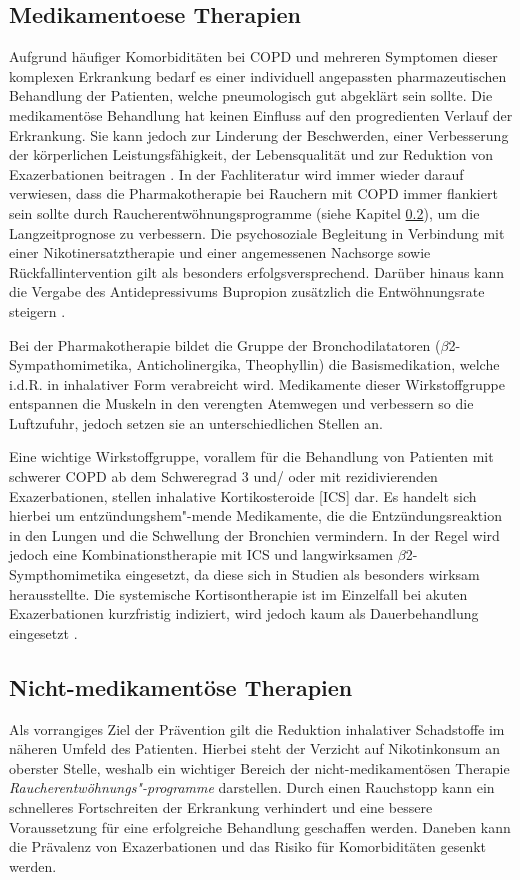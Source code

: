 \subsection{Medikamentoese Therapien}
\label{medikamentoese_therapien}
Aufgrund häufiger Komorbiditäten bei COPD und mehreren Symptomen dieser komplexen Erkrankung bedarf es einer individuell angepassten pharmazeutischen Behandlung der Patienten, welche pneumologisch gut abgeklärt sein sollte. Die medikamentöse Behandlung hat keinen Einfluss auf den progredienten Verlauf der Erkrankung. Sie kann jedoch zur Linderung der Beschwerden, einer Verbesserung der körperlichen Leistungsfähigkeit, der Lebensqualität und zur Reduktion von Exazerbationen beitragen \autocite[vgl.][249]{gillissen2007}. In der Fachliteratur wird immer wieder darauf verwiesen, dass die Pharmakotherapie bei Rauchern mit COPD immer flankiert sein sollte durch Raucherentwöhnungsprogramme (siehe Kapitel \ref{nicht-medikamentoese_therapien}), um die Langzeitprognose zu verbessern. Die psychosoziale Begleitung in Verbindung mit einer Nikotinersatztherapie und einer angemessenen Nachsorge sowie Rückfallintervention gilt als besonders erfolgsversprechend. Darüber hinaus kann die Vergabe des Antidepressivums Bupropion zusätzlich die Entwöhnungsrate steigern \autocite[vgl.][e12]{vogelmeier2007}.

Bei der Pharmakotherapie bildet die Gruppe der Bronchodilatatoren ($\beta$2- Sympathomimetika, Anticholinergika, Theophyllin) die Basismedikation, welche i.d.R. in inhalativer Form verabreicht wird.
Medikamente dieser Wirkstoffgruppe entspannen die Muskeln in den verengten Atemwegen und verbessern so die Luftzufuhr, jedoch setzen sie an unterschiedlichen Stellen an.

Eine wichtige Wirkstoffgruppe, vorallem für die Behandlung von Patienten mit schwerer COPD ab dem Schweregrad 3 und/ oder mit rezidivierenden Exazerbationen, stellen inhalative Kortikosteroide [ICS] dar. Es handelt sich hierbei um entzündungshem"-mende Medikamente, die die Entzündungsreaktion in den Lungen und die Schwellung der Bronchien vermindern. In der Regel wird jedoch eine Kombinationstherapie mit ICS und langwirksamen $\beta$2-Sympthomimetika eingesetzt, da diese sich in Studien als besonders wirksam herausstellte. Die systemische Kortisontherapie ist im Einzelfall bei akuten Exazerbationen kurzfristig indiziert, wird jedoch kaum als Dauerbehandlung eingesetzt \autocite[vgl.][249f., 253]{gillissen2007}.

\subsection{Nicht-medikamentöse Therapien}
\label{nicht-medikamentoese_therapien}
Als vorrangiges Ziel der Prävention gilt die Reduktion inhalativer Schadstoffe im näheren Umfeld des Patienten. Hierbei steht der Verzicht auf Nikotinkonsum an oberster Stelle, weshalb ein wichtiger Bereich der nicht-medikamentösen Therapie \emph{Raucherentwöhnungs"-programme} darstellen. Durch einen Rauchstopp kann ein schnelleres Fortschreiten der Erkrankung verhindert und eine bessere Voraussetzung für eine erfolgreiche Behandlung geschaffen werden. Daneben kann die Prävalenz von Exazerbationen und das Risiko für Komorbiditäten gesenkt werden.

